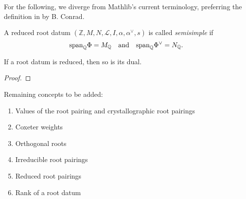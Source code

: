 For the following, we diverge from Mathlib's current terminology, preferring the definition in 
by B. Conrad. 
\begin{definition}
    \label{def:rp-semisimple}
    \leanok
    A reduced root datum $(\mathbb{Z},M,N,\mathcal{L},I,\alpha, \alpha^\vee,s)$ is called {\it semisimple} if
    \[
        {\rm span}_\mathbb{Q} \Phi = M_{\mathbb{Q}} \quad \text{and} \quad {\rm span}_{\mathbb{Q}} \Phi^\vee = N_{\mathbb{Q}}.
    \] 
\end{definition}

\begin{lemma}
    If a root datum is reduced, then so is its dual. 
\end{lemma}
\begin{proof}
    
\end{proof}




Remaining concepts to be added:
\begin{enumerate}
    \item Values of the root pairing and crystallographic root pairings
    \item Coxeter weights
    \item Orthogonal roots 
    \item Irreducible root pairings
    \item Reduced root pairings
    \item Rank of a root datum 
\end{enumerate}